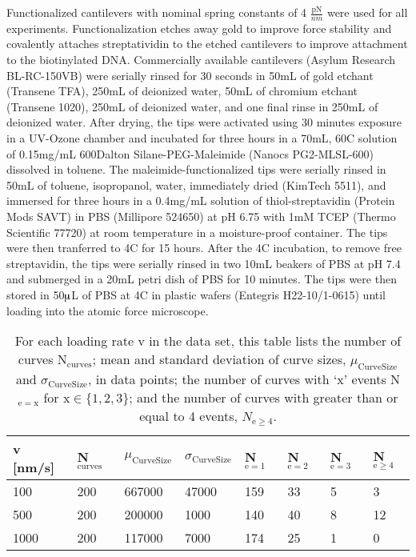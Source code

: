 \documentclass[%
  aip,12pt,tightenlines,
  amsthm,
 amsmath,amssymb
]{article}
\newcommand{\tLabel}[1]{\label{table:#1}}
\newcommand{\firstp}[0]{}
\newcommand{\pl}[0]{\vspace{6pt}}
\newcommand{\supply}[2]{(#1 #2)}
\newcommand{\degreeC}[0]{\degree{}C}
\begin{document}
\firstp Functionalized cantilevers with nominal spring constants of 4 $\frac{\text{pN}}{nm}$  were used for all experiments. Functionalization etches away gold to improve force stability\cite{sullan_atomic_2013} and covalently attaches streptatividin to the etched cantilevers to improve attachment to the biotinylated DNA. Commercially available cantilevers \supply{Asylum Research}{BL-RC-150VB} were serially rinsed for 30 seconds in 50mL of gold etchant \supply{Transene}{TFA}, 250mL of deionized water, 50mL of chromium etchant \supply{Transene}{1020}, 250mL of deionized water, and one final rinse in 250mL of deionized water. After drying, the tips were activated using 30 minutes exposure in a UV-Ozone chamber and incubated for three hours in a 70mL, 60\degreeC{} solution of 0.15mg/mL 600Dalton Silane-PEG-Maleimide \supply{Nanocs}{PG2-MLSL-600} dissolved in toluene. The maleimide-functionalized tips were serially rinsed in 50mL of toluene, isopropanol, water, immediately dried \supply{KimTech}{5511}, and immersed for three hours in a 0.4mg/mL solution of thiol-streptavidin \supply{Protein Mods}{SAVT} in PBS \supply{Millipore}{524650} at pH 6.75 with 1mM TCEP \supply{Thermo Scientific}{77720} at room temperature in a moisture-proof container. The tips were then tranferred to 4\degreeC{} for 15 hours. After the 4\degreeC{} incubation, to remove free streptavidin, the tips were serially rinsed in two 10mL beakers of PBS at pH 7.4 and submerged in a 20mL petri dish of PBS for 10 minutes. The tips were then stored in 50$\muup$L of PBS at 4C in plastic wafers \supply{Entegris}{H22-10/1-0615} until loading into the atomic force microscope. \pl


\begin{table}
\begin{tabularx}{\textwidth}{ l | l | l | l |l |l|l|l }
\hline \hline
v [nm/s] & N$_\mathrm{curves}$ & $\mu_{\mathrm{Curve Size}}$ & $\sigma_{\mathrm{Curve Size}}$ & N$_{\mathrm{e}= 1}$ & N$_{\mathrm{e}= 2}$ & N$_{\mathrm{e}= 3}$ & N$_{\mathrm{e}\ge4}$  \\ \hline
100 & 200 & 667000 & 47000 & 159 & 33 & 5 & 3  \\ \hline
500 & 200 & 200000 & 1000 & 140 & 40 & 8 & 12  \\ \hline
1000 & 200 & 117000 & 7000 & 174 & 25 & 1 & 0  \\ \hline
\end{tabularx}
\caption[Data set statistical information]{\tLabel{statistics} For each loading rate v in the data set, this table lists the number of curves N$_{\mathrm{curves}}$; mean and standard deviation of curve sizes, $\mu_{\mathrm{Curve Size}}$ and $\sigma_{\mathrm{Curve Size}}$, in data points; the number of curves with `x' events N$_{\mathrm{e=x}}$ for x$\in\{1,2,3\}$; and the number of curves with greater than or equal to 4 events, $N_{\mathrm{e}\ge4}$. }
\end{table}
\end{document}
